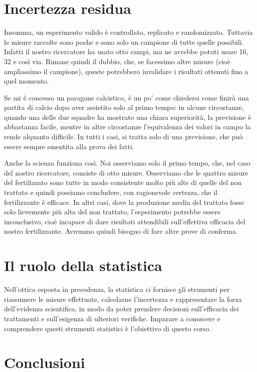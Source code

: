 \documentclass[a4paper,12pt,oneside]{book}
\theoremstyle{definition}
\theoremstyle{definition}
\theoremstyle{definition}
\theoremstyle{remark}
\begin{document}
\section{Incertezza residua}\label{incertezza-residua}

Insomma, un esperimento valido è controllato, replicato e randomizzato.
Tuttavia le misure raccolte sono poche e sono solo un campione di tutte
quelle possibili. Infatti il nostro ricercatore ha usato otto campi, ma
ne avrebbe potuti usare 16, 32 e così via. Rimane quindi il dubbio, che,
se facessimo altre misure (cioè ampliassimo il campione), queste
potrebbero invalidare i risultati ottenuti fino a quel momento.

Se mi è concesso un paragone calcistico, è un po' come chiedersi come
finirà una partita di calcio dopo aver assistito solo al primo tempo: in
alcune circostanze, quando una delle due squadre ha mostrato una chiara
superiorità, la previsione è abbastanza facile, mentre in altre
circostanze l'equivalenza dei valori in campo la rende alquanto
difficile. In tutti i casi, si tratta solo di una previsione, che può
essere sempre smentita alla prova dei fatti.

Anche la scienza funziona così. Noi osserviamo solo il primo tempo, che,
nel caso del nostro ricercatore, consiste di otto misure. Osserviamo che
le quattro misure del fertilizzato sono tutte in modo consistente molto
più alte di quelle del non trattato e quindi possiamo concludere, con
ragionevole certezza, che il fertilizzante è efficace. In altri casi,
dove la produzione media del trattato fosse solo lievemente più alta del
non trattato, l'esperimento potrebbe essere inconclusivo, cioè incapace
di dare risultati attendibili sull'effettiva efficacia del nostro
fertilizzante. Avremmo quindi bisogno di fare altre prove di conferma.

\section{Il ruolo della statistica}\label{il-ruolo-della-statistica}

Nell'ottica esposta in precedenza, la statistica ci fornisce gli
strumenti per riassumere le misure effettuate, calcolarne l'incertezza e
rappresentare la forza dell'evidenza scientifica, in modo da poter
prendere decisioni sull'efficacia dei trattamenti e sull'esigenza di
ulteriori verifiche. Imparare a conoscere e comprendere questi strumenti
statistici è l'obiettivo di questo corso.

\section{Conclusioni}\label{conclusioni}
\end{document}
